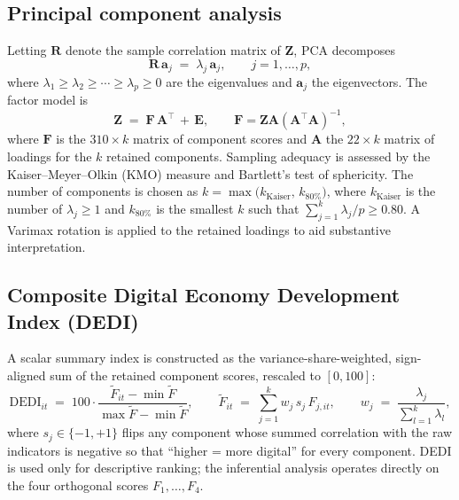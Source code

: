 \documentclass[12pt,letterpaper]{article}
\begin{document}
\subsection{Principal component analysis}

Letting $\bm{R}$ denote the sample correlation matrix of $\bm{Z}$, PCA
decomposes
\begin{equation}
  \bm{R}\, \bm{a}_{j} \;=\; \lambda_{j}\,\bm{a}_{j},
  \qquad j = 1,\dots,p,
  \label{eq:eig}
\end{equation}
where $\lambda_{1}\geq\lambda_{2}\geq\cdots\geq\lambda_{p}\geq 0$ are the
eigenvalues and $\bm{a}_{j}$ the eigenvectors.  The factor model is
\begin{equation}
  \bm{Z} \;=\; \bm{F}\,\bm{A}^{\!\top} \,+\, \bm{E},
  \qquad \bm{F} = \bm{Z}\bm{A}(\bm{A}^{\!\top}\bm{A})^{-1},
  \label{eq:pca}
\end{equation}
where $\bm{F}$ is the $310\times k$ matrix of component scores and $\bm{A}$ the
$22\times k$ matrix of loadings for the $k$ retained components.  Sampling
adequacy is assessed by the Kaiser--Meyer--Olkin (KMO) measure
\citep{kaiser1974} and Bartlett's test of sphericity.  The number of components
is chosen as $k = \max\!\bigl(k_{\text{Kaiser}},\,k_{80\%}\bigr)$, where
$k_{\text{Kaiser}}$ is the number of $\lambda_{j}\geq 1$ and $k_{80\%}$ is the
smallest $k$ such that $\sum_{j=1}^{k}\lambda_{j}/p \geq 0.80$.  A Varimax
rotation is applied to the retained loadings to aid substantive interpretation.

\subsection{Composite Digital Economy Development Index (DEDI)}

A scalar summary index is constructed as the variance-share-weighted, sign-aligned
sum of the retained component scores, rescaled to $[0,100]$:
\begin{equation}
  \text{DEDI}_{it} \;=\; 100 \cdot
  \frac{ \widetilde{F}_{it} - \min \widetilde{F}}{\max \widetilde{F} - \min \widetilde{F}},
  \qquad
  \widetilde{F}_{it} \;=\; \sum_{j=1}^{k} w_{j}\, s_{j}\, F_{j,it},
  \qquad
  w_{j} \;=\; \frac{\lambda_{j}}{\sum_{l=1}^{k}\lambda_{l}},
  \label{eq:dedi}
\end{equation}
where $s_{j}\in\{-1,+1\}$ flips any component whose summed correlation with the
raw indicators is negative so that ``higher = more digital'' for every
component.  DEDI is used only for descriptive ranking; the inferential analysis
operates directly on the four orthogonal scores $F_{1},\dots,F_{4}$.
\end{document}
